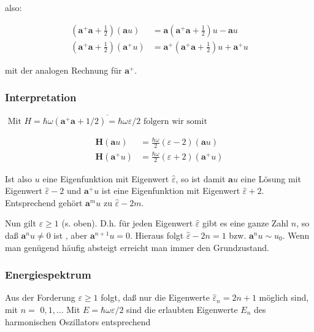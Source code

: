 \documentclass[10pt, letterpaper]{article}
\begin{document}
also:

$$
\begin{aligned}
\left(\mathbf{a}^{+} \mathbf{a}+\frac{1}{2}\right)(\mathbf{a} u) & =\mathbf{a}\left(\mathbf{a}^{+} \mathbf{a}+\frac{1}{2}\right) u-\mathbf{a} u \\
\left(\mathbf{a}^{+} \mathbf{a}+\frac{1}{2}\right)\left(\mathbf{a}^{+} u\right) & =\mathbf{a}^{+}\left(\mathbf{a}^{+} \mathbf{a}+\frac{1}{2}\right) u+\mathbf{a}^{+} u
\end{aligned}
$$

mit der analogen Rechnung für $\mathbf{a}^{+}$.

\subsubsection*{Interpretation}
$\overline{\text { Mit } H=\hbar \omega\left(\mathbf{a}^{+} \mathbf{a}+1 / 2\right)=\hbar \omega \varepsilon / 2 \text { folgern wir somit }}$

$$
\begin{aligned}
\mathbf{H}(\mathbf{a} u) & =\frac{\hbar \omega}{2}(\varepsilon-2)(\mathbf{a} u) \\
\mathbf{H}\left(\mathbf{a}^{+} u\right) & =\frac{\hbar \omega}{2}(\varepsilon+2)\left(\mathbf{a}^{+} u\right)
\end{aligned}
$$

Ist also $u$ eine Eigenfunktion mit Eigenwert $\widehat{\varepsilon}$, so ist damit $\mathbf{a} u$ eine Lösung mit Eigenwert $\widehat{\varepsilon}-2$ und $\mathbf{a}^{+} u$ ist eine Eigenfunktion mit Eigenwert $\widehat{\varepsilon}+2$. Entsprechend gehört $\mathbf{a}^{m} u$ zu $\widehat{\varepsilon}-2 m$.

Nun gilt $\varepsilon \geq 1$ (s. oben). D.h. für jeden Eigenwert $\widehat{\varepsilon}$ gibt es eine ganze Zahl $n$, so daß $\mathbf{a}^{n} u \neq 0$ ist , aber $\mathbf{a}^{n+1} u=0$. Hieraus folgt $\widehat{\varepsilon}-2 n=1$ bzw. $\mathbf{a}^{n} u \sim u_{0}$. Wenn man genügend häufig absteigt erreicht man immer den Grundzustand.

\subsubsection*{Energiespektrum}
Aus der Forderung $\varepsilon \geq 1$ folgt, daß nur die Eigenwerte $\widehat{\varepsilon}_{n}=2 n+1$ möglich sind, mit $n=$ $0,1, \ldots$ Mit $E=\hbar \omega \varepsilon / 2$ sind die erlaubten Eigenwerte $E_{n}$ des harmonischen Oszillators entsprechend
\end{document}
